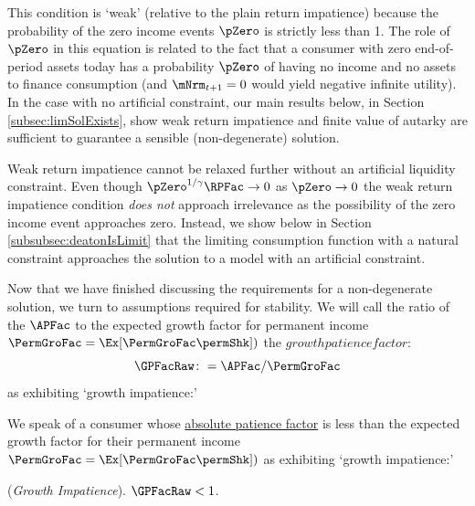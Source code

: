 \documentclass[BufferStockTheory]{subfiles}
\begin{document}
This condition is `weak' (relative to the plain return impatience) because the probability of the zero income events $\pZero$ is strictly less than 1.
The role of $\pZero$ in this equation is related to the fact that a consumer with zero end-of-period assets today has a probability $\pZero$ of having no income and no assets to finance consumption (and $\mNrm_{t+1}=0$ would yield negative infinite utility).
In the case with no artificial constraint, our main results below, in Section \ref{subsec:limSolExists},  show weak return impatience and finite value of autarky are sufficient to guarantee a sensible (non-degenerate) solution.

Weak return impatience cannot be relaxed further without an artificial liquidity constraint.
Even though $\pZero^{1/\CRRA} \RPFac\rightarrow 0$ as $\pZero\rightarrow 0$ the weak return impatience condition \textit{does not} approach irrelevance as the possibility of the zero income event approaches zero.
Instead, we show below in Section \ref{subsubsec:deatonIsLimit} that the limiting consumption function with a natural constraint approaches the solution to a model with an artificial constraint.
% 

Now that we have finished discussing the requirements for a non-degenerate solution, we turn to assumptions required for stability.
\hypertarget{GPFacRawDefn}{}
\newcommand{\GPFacRawName}{growth patience factor}
We will call the ratio of the $\APFac$ to the expected growth factor for permanent income $\PermGroFac = \Ex[\PermGroFac \permShk])$
the $\GPFacRawName$:
\begin{equation}\label{eq:GPFacRaw}
    \GPFacRaw \colon= \APFac/\PermGroFac
\end{equation}
as exhibiting `growth impatience:' 

We speak of a consumer whose \hyperlink{APFac}{absolute patience factor} is less than the expected growth factor for their permanent income $\PermGroFac = \Ex[\PermGroFac \permShk])$ as exhibiting `growth impatience:' 
\hypertarget{GICRaw}{}
\begin{assumS}\label{ass:GICRaw} (\textit{Growth Impatience}).
$ \GPFacRaw  < 1$.
\end{assumS}

\end{document}
